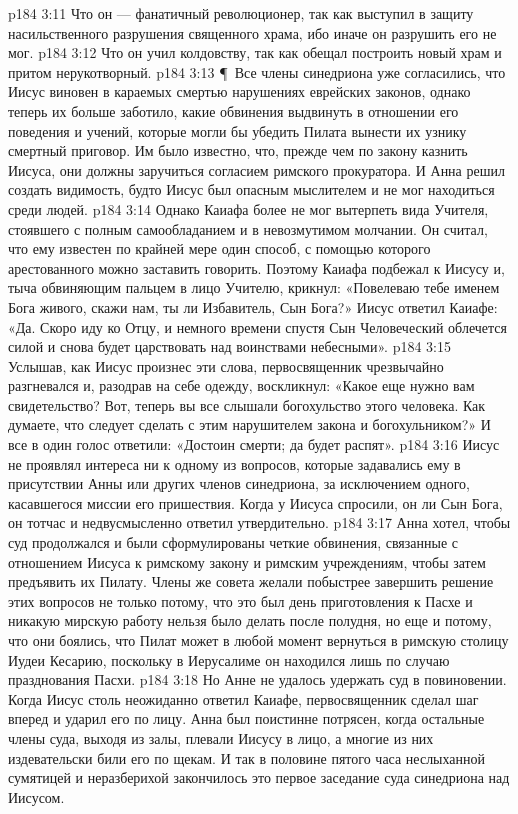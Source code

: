 \vs p184 3:11 \bibnobreakspace Что он --- фанатичный революционер, так как выступил в защиту насильственного разрушения священного храма, ибо иначе он разрушить его не мог.
\vs p184 3:12 \bibnobreakspace Что он учил колдовству, так как обещал построить новый храм и притом нерукотворный.
\vs p184 3:13 \P\ Все члены синедриона уже согласились, что Иисус виновен в караемых смертью нарушениях еврейских законов, однако теперь их больше заботило, какие обвинения выдвинуть в отношении его поведения и учений, которые могли бы убедить Пилата вынести их узнику смертный приговор. Им было известно, что, прежде чем по закону казнить Иисуса, они должны заручиться согласием римского прокуратора. И Анна решил создать видимость, будто Иисус был опасным мыслителем и не мог находиться среди людей.
\vs p184 3:14 Однако Каиафа более не мог вытерпеть вида Учителя, стоявшего с полным самообладанием и в невозмутимом молчании. Он считал, что ему известен по крайней мере один способ, с помощью которого арестованного можно заставить говорить. Поэтому Каиафа подбежал к Иисусу и, тыча обвиняющим пальцем в лицо Учителю, крикнул: «Повелеваю тебе именем Бога живого, скажи нам, ты ли Избавитель, Сын Бога?» Иисус ответил Каиафе: «Да. Скоро иду ко Отцу, и немного времени спустя Сын Человеческий облечется силой и снова будет царствовать над воинствами небесными».
\vs p184 3:15 Услышав, как Иисус произнес эти слова, первосвященник чрезвычайно разгневался и, разодрав на себе одежду, воскликнул: «Какое еще нужно вам свидетельство? Вот, теперь вы все слышали богохульство этого человека. Как думаете, что следует сделать с этим нарушителем закона и богохульником?» И все в один голос ответили: «Достоин смерти; да будет распят».
\vs p184 3:16 Иисус не проявлял интереса ни к одному из вопросов, которые задавались ему в присутствии Анны или других членов синедриона, за исключением одного, касавшегося миссии его пришествия. Когда у Иисуса спросили, он ли Сын Бога, он тотчас и недвусмысленно ответил утвердительно.
\vs p184 3:17 Анна хотел, чтобы суд продолжался и были сформулированы четкие обвинения, связанные с отношением Иисуса к римскому закону и римским учреждениям, чтобы затем предъявить их Пилату. Члены же совета желали побыстрее завершить решение этих вопросов не только потому, что это был день приготовления к Пасхе и никакую мирскую работу нельзя было делать после полудня, но еще и потому, что они боялись, что Пилат может в любой момент вернуться в римскую столицу Иудеи Кесарию, поскольку в Иерусалиме он находился лишь по случаю празднования Пасхи.
\vs p184 3:18 Но Анне не удалось удержать суд в повиновении. Когда Иисус столь неожиданно ответил Каиафе, первосвященник сделал шаг вперед и ударил его по лицу. Анна был поистинне потрясен, когда остальные члены суда, выходя из залы, плевали Иисусу в лицо, а многие из них издевательски били его по щекам. И так в половине пятого часа неслыханной сумятицей и неразберихой закончилось это первое заседание суда синедриона над Иисусом.
